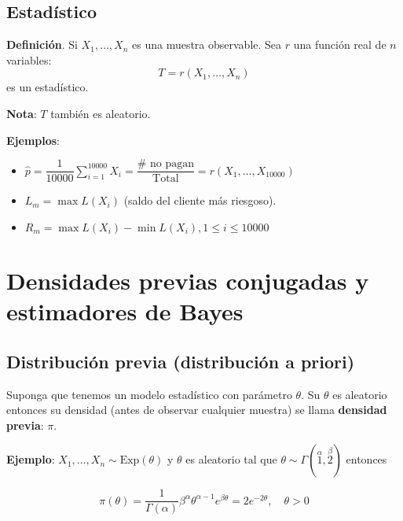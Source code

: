 \documentclass[
  12pt,
]{book}
\begin{document}
\hypertarget{estaduxedstico}{%
\section{Estadístico}\label{estaduxedstico}}

\textbf{Definición}. Si \(X_1,\dots,X_n\) es una muestra observable. Sea \(r\) una función real de \(n\) variables:
\begin{equation*}
T = r(X_1,\dots,X_n)
\end{equation*}
es un estadístico.

\textbf{Nota}: \(T\) también es aleatorio.

\textbf{Ejemplos}:

\begin{itemize}
\item
  \(\hat p = \dfrac{1}{10000}\displaystyle\sum_{i=1}^{10000}X_i = \dfrac{\#\text{ no pagan}}{\text{Total}} = r(X_1,\dots,X_{10000})\)
\item
  \(L_m = \max L(X_i)\) (saldo del cliente más riesgoso).
\item
  \(R_m = \max L(X_i) - \min L(X_i), 1\leq i\leq 10000\)
\end{itemize}

\hypertarget{densidades-previas-conjugadas-y-estimadores-de-bayes}{%
\chapter{Densidades previas conjugadas y estimadores de Bayes}\label{densidades-previas-conjugadas-y-estimadores-de-bayes}}

\hypertarget{distribuciuxf3n-previa-distribuciuxf3n-a-priori}{%
\section{Distribución previa (distribución a priori)}\label{distribuciuxf3n-previa-distribuciuxf3n-a-priori}}

Suponga que tenemos un modelo estadístico con parámetro \(\theta\). Su \(\theta\) es aleatorio entonces su densidad (antes de observar cualquier muestra) se llama \textbf{densidad previa}: \(\pi\).

\textbf{Ejemplo}: \(X_1,\dots, X_n \sim \text{Exp}(\theta)\) y \(\theta\) es aleatorio tal que \(\theta \sim \Gamma(\stackrel{\alpha}{1},\stackrel{\beta}{2})\) entonces

\[ \pi(\theta) = \dfrac{1}{\Gamma(\alpha)}\beta^\alpha\theta^{\alpha-1}e^{\beta\theta} = 2e^{-2\theta}, \quad \theta > 0\]
\end{document}
